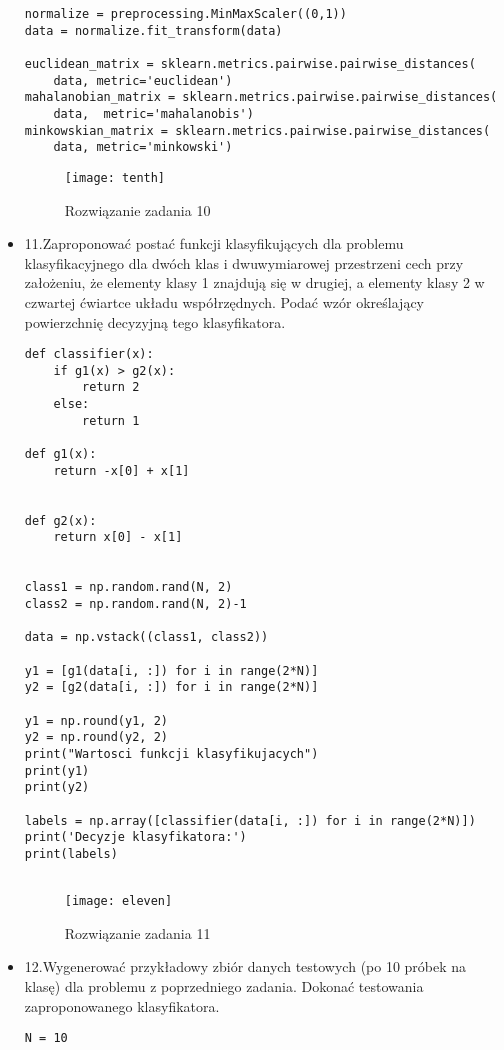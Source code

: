 \documentclass[12pt,a4paper]{article}
\begin{document}
\begin{itemize}
\begin{lstlisting}
normalize = preprocessing.MinMaxScaler((0,1))
data = normalize.fit_transform(data)

euclidean_matrix = sklearn.metrics.pairwise.pairwise_distances(
    data, metric='euclidean')
mahalanobian_matrix = sklearn.metrics.pairwise.pairwise_distances(
    data,  metric='mahalanobis')
minkowskian_matrix = sklearn.metrics.pairwise.pairwise_distances(
    data, metric='minkowski')

	\end{lstlisting}
		\begin{figure}[h]
                        \texttt{[image: tenth]}
                        \centering
			\caption{Rozwiązanie zadania 10}
			\label{fig:fig10}
                \end{figure}
                \clearpage
\item 11.Zaproponować postać funkcji klasyfikujących dla problemu klasyfikacyjnego dla dwóch klas i dwuwymiarowej przestrzeni cech przy założeniu, że elementy klasy 1 znajdują się w drugiej, a elementy klasy 2 w czwartej ćwiartce układu współrzędnych. Podać wzór określający powierzchnię decyzyjną tego klasyfikatora.
	\begin{lstlisting}
def classifier(x):
    if g1(x) > g2(x):
        return 2
    else:
        return 1

def g1(x):
    return -x[0] + x[1]


def g2(x):
    return x[0] - x[1]


class1 = np.random.rand(N, 2)
class2 = np.random.rand(N, 2)-1

data = np.vstack((class1, class2))

y1 = [g1(data[i, :]) for i in range(2*N)]
y2 = [g2(data[i, :]) for i in range(2*N)]

y1 = np.round(y1, 2)
y2 = np.round(y2, 2)
print("Wartosci funkcji klasyfikujacych")
print(y1)
print(y2)

labels = np.array([classifier(data[i, :]) for i in range(2*N)])
print('Decyzje klasyfikatora:')
print(labels)


	\end{lstlisting}
		\begin{figure}[h]
                        \texttt{[image: eleven]}
                        \centering
			\caption{Rozwiązanie zadania 11}
			\label{fig:fig11}
                \end{figure}
                \clearpage
\item 12.Wygenerować przykładowy zbiór danych testowych (po 10 próbek na klasę) dla problemu z poprzedniego zadania. Dokonać testowania zaproponowanego klasyfikatora.
	\begin{lstlisting}
N = 10


\end{lstlisting}
\end{itemize}
\end{document}
